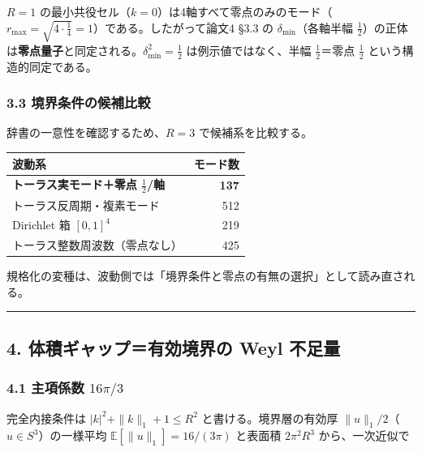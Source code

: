 \documentclass[
]{ltjsarticle}
\newcounter{none} %
\begin{document}
\(R=1\)
の最小共役セル（\(k=0\)）は4軸すべて零点のみのモード（\(r_{\max}=\sqrt{4\cdot\tfrac14}=1\)）である。したがって論文4
§3.3 の \(\delta_{\min}\)（各軸半幅
\(\tfrac12\)）の正体は\textbf{零点量子}と同定される。\(\delta_{\min}^2=\tfrac12\)
は例示値ではなく、半幅 \(\tfrac12\)＝零点 \(\tfrac12\)
という構造的同定である。

\subsubsection{3.3
境界条件の候補比較}\label{ux5883ux754cux6761ux4ef6ux306eux5019ux88dcux6bd4ux8f03}

辞書の一意性を確認するため、\(R=3\) で候補系を比較する。

{\def\LTcaptype{none} %
\begin{longtable}[]{@{}lr@{}}
\toprule\noalign{}
波動系 & モード数 \\
\midrule\noalign{}
\endhead
\bottomrule\noalign{}
\endlastfoot
\textbf{トーラス実モード＋零点 \(\tfrac12\)/軸} & \textbf{137} \\
トーラス反周期・複素モード & 512 \\
Dirichlet 箱 \([0,1]^4\) & 219 \\
トーラス整数周波数（零点なし） & 425 \\
\end{longtable}
}

規格化の変種は、波動側では「境界条件と零点の有無の選択」として読み直される。

\begin{center}\rule{0.5\linewidth}{0.5pt}\end{center}

\subsection{4. 体積ギャップ＝有効境界の Weyl
不足量}\label{ux4f53ux7a4dux30aeux30e3ux30c3ux30d7ux6709ux52b9ux5883ux754cux306e-weyl-ux4e0dux8db3ux91cf}

\subsubsection{\texorpdfstring{4.1 主項係数
\(16\pi/3\)}{4.1 主項係数 16\textbackslash pi/3}}\label{ux4e3bux9805ux4fc2ux6570-16pi3}

完全内接条件は \(|k|^2+\|k\|_1+1\le R^2\) と書ける。境界層の有効厚
\(\|u\|_1/2\)（\(u\in S^3\)）の一様平均
\(\mathbb{E}[\|u\|_1]=16/(3\pi)\) と表面積 \(2\pi^2R^3\)
から、一次近似で
\end{document}
